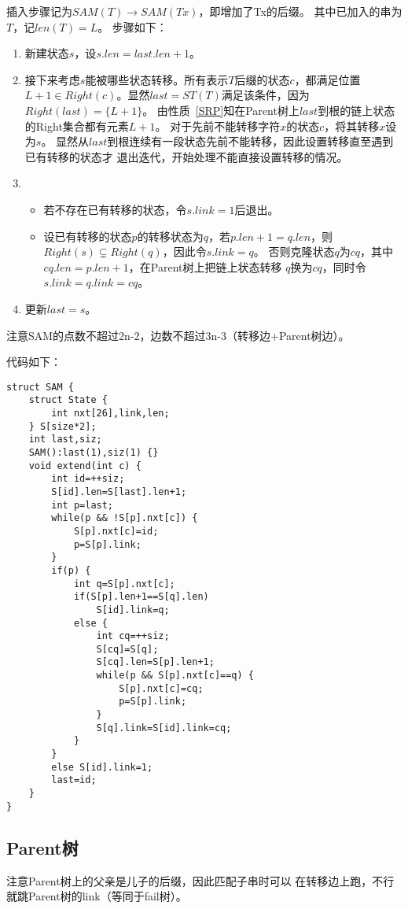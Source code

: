 插入步骤记为$SAM(T)\rightarrow SAM(Tx)$，即增加了Tx的后缀。
其中已加入的串为$T$，记$len(T)=L$。
步骤如下：
\begin{enumerate}
    \item 新建状态$s$，设$s.len=last.len+1$。
    \item 接下来考虑$s$能被哪些状态转移。所有表示$T$后缀的状态$c$，都满足位置
    $L+1 \in Right(c)$。显然$last=ST(T)$满足该条件，因为$Right(last)=\{L+1\}$。
    由性质~\ref{SRP}知在Parent树上$last$到根的链上状态的Right集合都有元素$L+1$。
    对于先前不能转移字符$x$的状态$c$，将其转移$x$设为$s$。
    显然从$last$到根连续有一段状态先前不能转移，因此设置转移直至遇到已有转移的状态才
    退出迭代，开始处理不能直接设置转移的情况。
    \item \begin{itemize}
        \item 若不存在已有转移的状态，令$s.link=1$后退出。
        \item 设已有转移的状态$p$的转移状态为$q$，若$p.len+1=q.len$，则
        $Right(s)\subsetneq Right(q)$，因此令$s.link=q$。
        否则克隆状态$q$为$cq$，其中$cq.len=p.len+1$，在Parent树上把链上状态转移
        $q$换为$cq$，同时令$s.link=q.link=cq$。
    \end{itemize}
    \item 更新$last=s$。
\end{enumerate}
注意SAM的点数不超过2n-2，边数不超过3n-3（转移边+Parent树边）。

代码如下：
\begin{lstlisting}
struct SAM {
    struct State {
        int nxt[26],link,len;
    } S[size*2];
    int last,siz;
    SAM():last(1),siz(1) {}
    void extend(int c) {
        int id=++siz;
        S[id].len=S[last].len+1;
        int p=last;
        while(p && !S[p].nxt[c]) {
            S[p].nxt[c]=id;
            p=S[p].link;
        }
        if(p) {
            int q=S[p].nxt[c];
            if(S[p].len+1==S[q].len)
                S[id].link=q;
            else {
                int cq=++siz;
                S[cq]=S[q];
                S[cq].len=S[p].len+1;
                while(p && S[p].nxt[c]==q) {
                    S[p].nxt[c]=cq;
                    p=S[p].link;
                }
                S[q].link=S[id].link=cq;
            }
        }
        else S[id].link=1;
        last=id;
    }
}
\end{lstlisting}
\subsection{Parent树}
注意Parent树上的父亲是儿子的后缀，因此匹配子串时可以
在转移边上跑，不行就跳Parent树的link（等同于fail树）。

